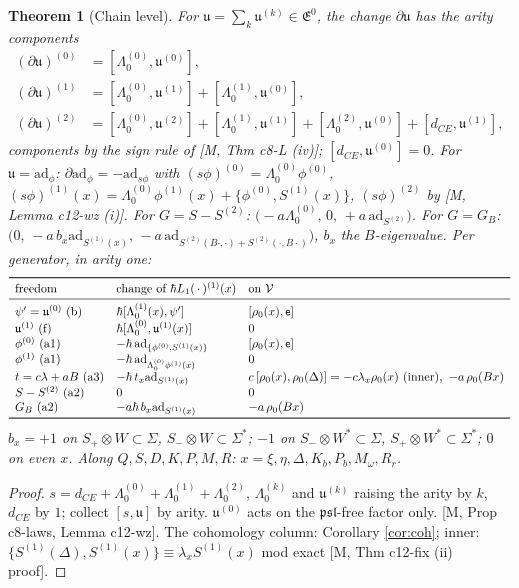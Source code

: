 \documentclass[10pt]{article}
\newtheorem{theorem}{Theorem}[section]
\theoremstyle{definition}
\newcommand{\E}{\mathfrak E}
\newcommand{\V}{\mathcal V}
\newcommand{\ad}{\mathrm{ad}}
\newcommand{\ee}{\mathsf e}
\begin{document}
\begin{theorem}[Chain level]\label{thm:laws}
For $\mathfrak u=\sum_k\mathfrak u^{(k)}\in\E^0$, the change $\partial\mathfrak u$ has the arity components
\[
\begin{aligned}
(\partial\mathfrak u)^{(0)}&=[\Lambda_0^{(0)},\mathfrak u^{(0)}],\\
(\partial\mathfrak u)^{(1)}&=[\Lambda_0^{(0)},\mathfrak u^{(1)}]+[\Lambda_0^{(1)},\mathfrak u^{(0)}],\\
(\partial\mathfrak u)^{(2)}&=[\Lambda_0^{(0)},\mathfrak u^{(2)}]+[\Lambda_0^{(1)},\mathfrak u^{(1)}]+[\Lambda_0^{(2)},\mathfrak u^{(0)}]+[d_{CE},\mathfrak u^{(1)}],
\end{aligned}
\]
components by the sign rule of [M, Thm c8-L (iv)]; $[d_{CE},\mathfrak u^{(0)}]=0$. For $\mathfrak u=\ad_\phi$: $\partial\ad_\phi=-\ad_{s\phi}$ with $(s\phi)^{(0)}=\Lambda_0^{(0)}\phi^{(0)}$, $(s\phi)^{(1)}(x)=\Lambda_0^{(0)}\phi^{(1)}(x)+\{\phi^{(0)},S^{(1)}(x)\}$, $(s\phi)^{(2)}$ by [M, Lemma c12-wz (i)]. For $G=S-S^{(2)}$: $\big(-a\Lambda_0^{(0)},\,0,\,+a\,\ad_{S^{(2)}}\big)$. For $G=G_B$: $\big(0,\,-a\,b_x\ad_{S^{(1)}(x)},\,-a\,\ad_{S^{(2)}(B\cdot,\cdot)+S^{(2)}(\cdot,B\cdot)}\big)$, $b_x$ the $B$-eigenvalue. Per generator, in arity one:
\[
\begin{array}{lll}
\toprule
\text{freedom}&\text{change of }\hbar L_1(\,\cdot\,)^{(1)}(x)&\text{on }\V\\\midrule
\psi'=\mathfrak u^{(0)}\ \text{(b)}&\hbar[\Lambda_0^{(1)}(x),\psi']&[\rho_0(x),\ee]\\
\mathfrak u^{(1)}\ \text{(f)}&\hbar[\Lambda_0^{(0)},\mathfrak u^{(1)}(x)]&0\\
\phi^{(0)}\ \text{(a1)}&-\hbar\,\ad_{\{\phi^{(0)},S^{(1)}(x)\}}&[\rho_0(x),\ee]\\
\phi^{(1)}\ \text{(a1)}&-\hbar\,\ad_{\Lambda_0^{(0)}\phi^{(1)}(x)}&0\\
t=c\lambda+aB\ \text{(a3)}&-\hbar\,t_x\ad_{S^{(1)}(x)}&c\,[\rho_0(x),\rho_0(\Delta)]=-c\lambda_x\rho_0(x)\ \text{(inner)},\ -a\,\rho_0(Bx)\\
S-S^{(2)}\ \text{(a2)}&0&0\\
G_B\ \text{(a2)}&-a\hbar\,b_x\ad_{S^{(1)}(x)}&-a\,\rho_0(Bx)\\
\bottomrule
\end{array}
\]
$b_x=+1$ on $S_+\otimes W\subset\Sigma$, $S_-\otimes W\subset\Sigma^*$; $-1$ on $S_-\otimes W^*\subset\Sigma$, $S_+\otimes W^*\subset\Sigma^*$; $0$ on even $x$. Along $Q,S,D,K,P,M,R$: $x=\xi,\eta,\Delta,K_b,P_b,M_\omega,R_r$.
\end{theorem}
\begin{proof}
$s=d_{CE}+\Lambda_0^{(0)}+\Lambda_0^{(1)}+\Lambda_0^{(2)}$, $\Lambda_0^{(k)}$ and $\mathfrak u^{(k)}$ raising the arity by $k$, $d_{CE}$ by $1$; collect $[s,\mathfrak u]$ by arity. $\mathfrak u^{(0)}$ acts on the $\mathfrak{psl}$-free factor only. [M, Prop c8-laws, Lemma c12-wz]. The cohomology column: Corollary \ref{cor:coh}; inner: $\{S^{(1)}(\Delta),S^{(1)}(x)\}\equiv\lambda_xS^{(1)}(x)$ mod exact [M, Thm c12-fix (ii) proof].
\end{proof}
\end{document}

